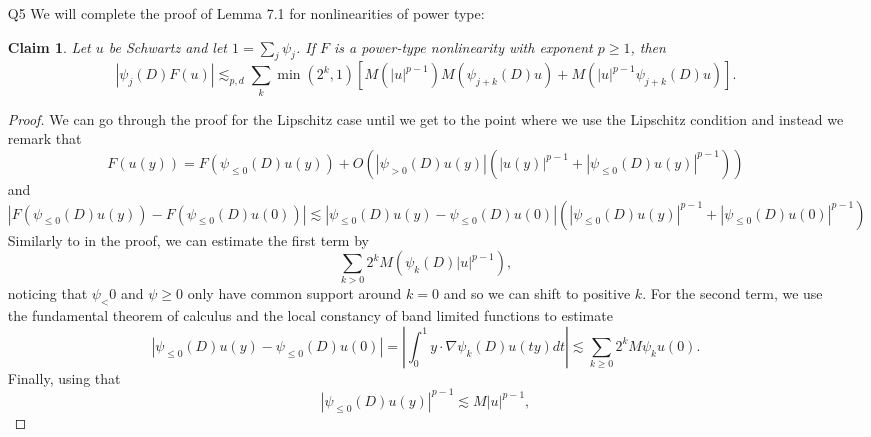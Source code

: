 \documentclass[11pt]{article}
\newtheorem*{claim}{Claim}
\theoremstyle{remark}
\newcommand{\1}{\textbf{1}}
\newcommand{\lle}{\lesssim}
\def\norm#1{\| #1  \|}
\begin{document}
\begin{enumerate}
\begin{proof}
%
\end{proof}
\item[Q5] We will complete the proof of Lemma 7.1 for nonlinearities of power type:
\begin{claim}
Let $u$ be Schwartz and let $1 = \sum_j \psi_j$. If $F$ is a power-type nonlinearity with exponent $p \geq 1$, then
\[
|\psi_j(D)F(u)| \lle_{p,d} \sum_k \min(2^k,1)[M(|u|^{p-1}) M( \psi_{j +k}(D) u) + M(|u|^{p-1} \psi_{j+k}(D)u)].
\]
\end{claim}
\begin{proof}
We can go through the proof for the Lipschitz case until we get to the point where we use the Lipschitz condition and instead we remark that
\[
F(u(y)) = F(\psi_{\leq 0}(D) u(y)) + O\left(|\psi_{> 0}(D) u(y)|(|u(y)|^{p-1} +|\psi_{\leq 0}(D) u(y)|^{p-1})\right)
\]
and
\[
|F(\psi_{\leq 0}(D) u(y)) - F(\psi_{\leq 0}(D) u(0))| \lle |\psi_{\leq 0}(D) u(y) - \psi_{\leq 0}(D) u(0)|( |\psi_{\leq 0}(D) u(y)|^{p-1} + |\psi_{\leq 0}(D) u(0)|^{p-1})
\]
Similarly to in the proof, we can estimate the first term by
\[
\sum_{k > 0} 2^k M(\psi_k(D) |u|^{p-1}),
\]
noticing that $\psi_< 0$ and $\psi \geq 0$ only have common support around $k=0$ and so we can shift to positive $k$. For the second term, we use the fundamental theorem of calculus and the local constancy of band limited functions to estimate
\[
|\psi_{\leq 0}(D) u(y) - \psi_{\leq 0}(D) u(0)| = |\int_0^1 y \cdot \nabla \psi_k(D) u(ty) dt| \lle \sum_{k \geq 0} 2^k M \psi_k u(0).
\]
Finally, using that
\[
|\psi_{\leq 0}(D) u(y)|^{p-1} \lle M |u|^{p-1},
\]
\end{proof}
\end{enumerate}
\end{document}
